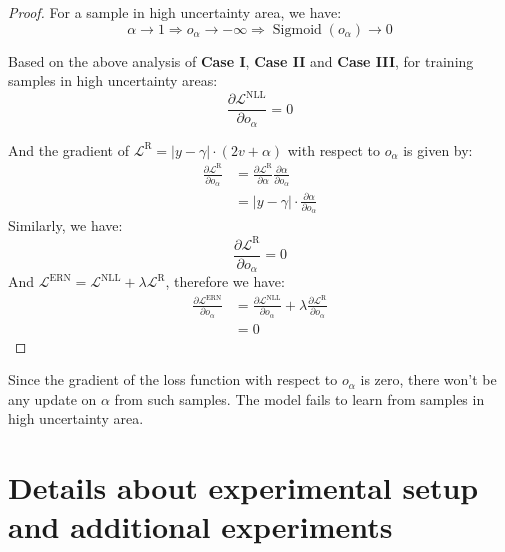 \begin{proof}
For a sample in high uncertainty area, we have:
\begin{equation}
    \alpha \rightarrow 1 \Rightarrow o_\alpha \rightarrow-\infty \Rightarrow \operatorname{Sigmoid}\left(o_\alpha\right) \rightarrow 0
\end{equation}


Based on the above analysis of \textbf{Case I}, \textbf{Case II} and \textbf{Case III}, for training samples in high uncertainty areas:
\begin{equation}
    \frac{\partial \mathcal{L}^{\mathrm{NLL}}}{\partial o_\alpha} = 0
\end{equation}

And the gradient of $\mathcal{L}^{\mathrm{R}}=|y-\gamma| \cdot(2 v+\alpha)$ with respect to $o_{\alpha}$ is given by:
\begin{equation}
\begin{aligned}
    \frac{\partial \mathcal{L}^{\mathrm{R}}}{\partial o_\alpha}&=\frac{\partial \mathcal{L}^{\mathrm{R}}}{\partial \alpha} \frac{\partial \alpha}{\partial o_\alpha} \\
    &= |y-\gamma| \cdot \frac{\partial \alpha}{\partial o_\alpha}
\end{aligned}
\end{equation}
Similarly, we have:
\begin{equation}
    \frac{\partial \mathcal{L}^{\mathrm{R}}}{\partial o_\alpha} = 0
\end{equation}
And $\mathcal{L}^{\mathrm{ERN}}=\mathcal{L}^{\mathrm{NLL}}+\lambda \mathcal{L}^{\mathrm{R}}$, therefore we have:
\begin{equation}
\begin{aligned}
\frac{\partial \mathcal{L}^{\mathrm{ERN}}}{\partial o_\alpha} &= \frac{\partial \mathcal{L}^{\mathrm{NLL}}}{\partial o_\alpha} +\lambda \frac{\partial \mathcal{L}^{\mathrm{R}}}{\partial o_\alpha} \\
&=0
\end{aligned}
\end{equation}
\end{proof}

Since the gradient of the loss function with respect to $o_{\alpha}$ is zero, there won't be any update on $\alpha$ from such samples. The model fails to learn from samples in high uncertainty area.


\section{Details about experimental setup and additional experiments}
\label{appendix_2}


